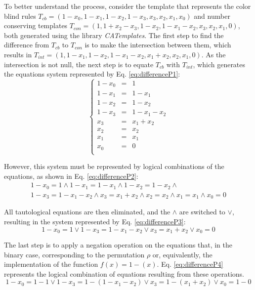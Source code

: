 \documentclass{llncs}
\begin{document}
To better understand the process, consider the template that represents the color blind rules $T_{cb} = (1 - x_0, 1 - x_1, 1 - x_2, 1 - x_3, x_3, x_2, x_1, x_0)$ and number conserving templates $T_{con} = (1, 1 + x_2 - x_3, 1 - x_2, 1 - x_1 - x_2, x_3, x_2, x_1, 0)$, both generated using the library \textit{CATemplates}. The first step to find the difference from $T_{cb}$ to $T_{con}$ is to make the intersection between them, which results in $T_{int} = (1, 1 - x_1, 1 - x_2, 1 - x_1 - x_2, x_1 + x_2, x_2, x_1, 0)$. As the intersection is not null, the next step is to equate $T_{cb}$ with $T_{int}$, which generates the equations system represented by Eq. \ref{eq:differenceP1}: \begin{equation} \left\{\begin{matrix} 1 - x_0 & = & 1       \\ 1 - x_1  & = & 1 - x_1     \\ 1 - x_2  & = & 1 - x_2     \\ 1 - x_3  & = & 1 - x_1 - x_2 \\
x_3   & = & x_1 + x_2   \\
x_2   & = & x_2       \\
x_1   & = & x_1       \\
x_0   & = & 0       \\
\end{matrix}\right.
\label{eq:differenceP1}
\end{equation}

However, this system must be represented by logical combinations of the equations, as shown in Eq. \ref{eq:differenceP2}:
\begin{equation}
\begin{split}
1 - x_0 = 1       \wedge
1 - x_1 = 1 - x_1   \wedge
1 - x_2 = 1 - x_2   \wedge\\
1 - x_3 = 1 - x_1 - x_2 \wedge 
x_3   = x_1 + x_2   \wedge
x_2   = x_2     \wedge
x_1   = x_1     \wedge
x_0   = 0       
\label{eq:differenceP2}
\end{split}
\end{equation}

All tautological equations are then eliminated, and the $\wedge$ are switched to $\vee$, resulting in the system represented by Eq. \ref{eq:differenceP3}:
\begin{equation}
1 - x_0 = 1       \vee 
1 - x_3 = 1 - x_1 - x_2 \vee
x_3   = x_1 + x_2   \vee 
x_0   = 0       
\label{eq:differenceP3}
\end{equation}

The last step is to apply a negation operation on the equations that, in the binary case, corresponding to the permutation $\rho $ or, equivalently, the implementation of the function $f(x) = 1 - (x)$. Eq. \ref{eq:differenceP4} represents the logical combination of equations resulting from these operations.
\begin{equation}
1 - x_0 = 1 - 1         \vee 
1 - x_3 = 1 - (1 - x_1 - x_2) \vee
x_3   = 1 - (x_1 + x_2)   \vee 
x_0   = 1 - 0       
\label{eq:differenceP4}
\end{equation}
\end{document}
